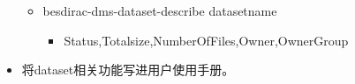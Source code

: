 \documentclass{beamer}
\begin{document}
\begin{CJK*}{UTF8}{}
\begin{frame}
\begin{itemize}
\begin{itemize}
        \item besdirac-dms-dataset-describe datasetname
          \begin{itemize}
            \item Status,Totalsize,NumberOfFiles,Owner,OwnerGroup
          \end{itemize}
      \end{itemize}
    \item 将dataset相关功能写进用户使用手册。
  \end{itemize}
\end{frame}

\end{CJK*}
\end{document}
